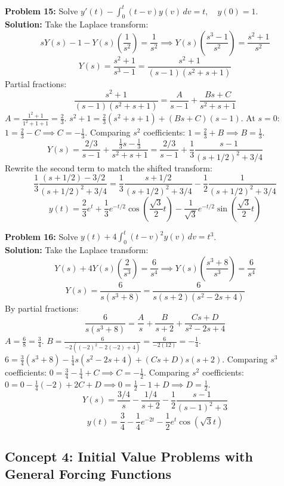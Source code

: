 \documentclass[11pt, letterpaper]{article}
\theoremstyle{definition}
\theoremstyle{remark}
\begin{document}
\textbf{Problem 15:} Solve $y'(t) - \int_0^t (t-v)y(v) \, dv = t, \quad y(0) = 1$.
\vspace{0.5em}\\
\textbf{Solution:}
Take the Laplace transform:
\[ sY(s) - 1 - Y(s)\left(\frac{1}{s^2}\right) = \frac{1}{s^2} \implies Y(s)\left(\frac{s^3-1}{s^2}\right) = \frac{s^2+1}{s^2} \]
\[ Y(s) = \frac{s^2+1}{s^3-1} = \frac{s^2+1}{(s-1)(s^2+s+1)} \]
Partial fractions:
\[ \frac{s^2+1}{(s-1)(s^2+s+1)} = \frac{A}{s-1} + \frac{Bs+C}{s^2+s+1} \]
$A = \frac{1^2+1}{1^2+1+1} = \frac{2}{3}$.
$s^2+1 = \frac{2}{3}(s^2+s+1) + (Bs+C)(s-1)$.
At $s=0$: $1 = \frac{2}{3} - C \implies C = -\frac{1}{3}$.
Comparing $s^2$ coefficients: $1 = \frac{2}{3} + B \implies B = \frac{1}{3}$.
\[ Y(s) = \frac{2/3}{s-1} + \frac{\frac{1}{3}s - \frac{1}{3}}{s^2+s+1} = \frac{2/3}{s-1} + \frac{1}{3} \frac{s - 1}{(s+1/2)^2 + 3/4} \]
Rewrite the second term to match the shifted transform:
\[ \frac{1}{3} \frac{(s+1/2) - 3/2}{(s+1/2)^2 + 3/4} = \frac{1}{3} \frac{s+1/2}{(s+1/2)^2 + 3/4} - \frac{1}{2} \frac{1}{(s+1/2)^2 + 3/4} \]
\[ y(t) = \frac{2}{3}e^t + \frac{1}{3}e^{-t/2}\cos\left(\frac{\sqrt{3}}{2}t\right) - \frac{1}{\sqrt{3}}e^{-t/2}\sin\left(\frac{\sqrt{3}}{2}t\right) \]

\textbf{Problem 16:} Solve $y(t) + 4 \int_0^t (t-v)^2 y(v) \, dv = t^3$.
\vspace{0.5em}\\
\textbf{Solution:}
Take the Laplace transform:
\[ Y(s) + 4Y(s)\left(\frac{2}{s^3}\right) = \frac{6}{s^4} \implies Y(s)\left(\frac{s^3+8}{s^3}\right) = \frac{6}{s^4} \]
\[ Y(s) = \frac{6}{s(s^3+8)} = \frac{6}{s(s+2)(s^2-2s+4)} \]
By partial fractions:
\[ \frac{6}{s(s^3+8)} = \frac{A}{s} + \frac{B}{s+2} + \frac{Cs+D}{s^2-2s+4} \]
$A = \frac{6}{8} = \frac{3}{4}$. $B = \frac{6}{-2((-2)^2-2(-2)+4)} = \frac{6}{-2(12)} = -\frac{1}{4}$.
$6 = \frac{3}{4}(s^3+8) - \frac{1}{4}s(s^2-2s+4) + (Cs+D)s(s+2)$.
Comparing $s^3$ coefficients: $0 = \frac{3}{4} - \frac{1}{4} + C \implies C = -\frac{1}{2}$.
Comparing $s^2$ coefficients: $0 = 0 - \frac{1}{4}(-2) + 2C + D \implies 0 = \frac{1}{2} - 1 + D \implies D = \frac{1}{2}$.
\[ Y(s) = \frac{3/4}{s} - \frac{1/4}{s+2} - \frac{1}{2} \frac{s-1}{(s-1)^2+3} \]
\[ y(t) = \frac{3}{4} - \frac{1}{4}e^{-2t} - \frac{1}{2}e^t\cos(\sqrt{3}t) \]

\subsection{Concept 4: Initial Value Problems with General Forcing Functions}
\end{document}

